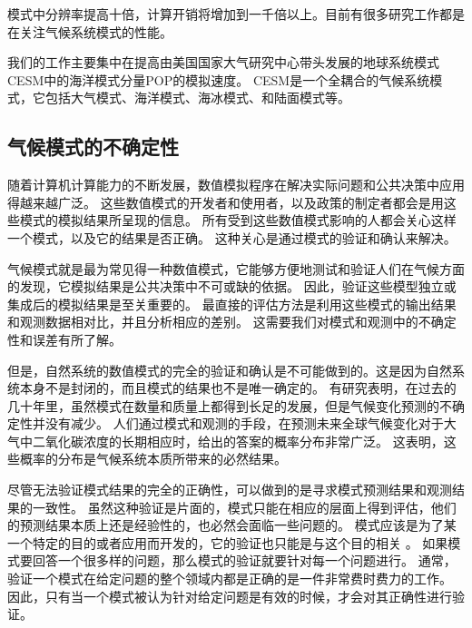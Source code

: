 模式中分辨率提高十倍，计算开销将增加到一千倍以上。目前有很多研究工作都是在关注气候系统模式的性能\cite{Worley:2011:PCE:2063384.2063457,dennis2012computational}。 

我们的工作主要集中在提高由美国国家大气研究中心带头发展的地球系统模式CESM中的海洋模式分量POP的模拟速度。 CESM是一个全耦合的气候系统模式，它包括大气模式、海洋模式、海冰模式、和陆面模式等。


 

\subsection{气候模式的不确定性}
随着计算机计算能力的不断发展，数值模拟程序在解决实际问题和公共决策中应用得越来越广泛。 
这些数值模式的开发者和使用者，以及政策的制定者都会是用这些模式的模拟结果所呈现的信息。
所有受到这些数值模式影响的人都会关心这样一个模式，以及它的结果是否正确。
这种关心是通过模式的验证和确认来解决\cite{whitner1989guidelines,stainforth2005uncertainty}。

气候模式就是最为常见得一种数值模式，它能够方便地测试和验证人们在气候方面的发现，它模拟结果是公共决策中不可或缺的依据\cite{allen2002towards,reynolds1994random}。
因此，验证这些模型独立或集成后的模拟结果是至关重要的。
最直接的评估方法是利用这些模式的输出结果和观测数据相对比，并且分析相应的差别。 
这需要我们对模式和观测中的不确定性和误差有所了解。 

但是，自然系统的数值模式的完全的验证和确认是不可能做到的。这是因为自然系统本身不是封闭的，而且模式的结果也不是唯一确定的\cite{oreskes1994verification}。
有研究表明，在过去的几十年里，虽然模式在数量和质量上都得到长足的发展，但是气候变化预测的不确定性并没有减少\cite{roe2007climate}。 
人们通过模式和观测的手段，在预测未来全球气候变化对于大气中二氧化碳浓度的长期相应时，给出的答案的概率分布非常广泛。
这表明，这些概率的分布是气候系统本质所带来的必然结果。 

尽管无法验证模式结果的完全的正确性，可以做到的是寻求模式预测结果和观测结果的一致性。
虽然这种验证是片面的，模式只能在相应的层面上得到评估，他们的预测结果本质上还是经验性的，也必然会面临一些问题的。
模式应该是为了某一个特定的目的或者应用而开发的，它的验证也只能是与这个目的相关\cite{sargent2005verification} 。 
如果模式要回答一个很多样的问题，那么模式的验证就要针对每一个问题进行。
通常，验证一个模式在给定问题的整个领域内都是正确的是一件非常费时费力的工作。 
因此，只有当一个模式被认为针对给定问题是有效的时候，才会对其正确性进行验证。 

